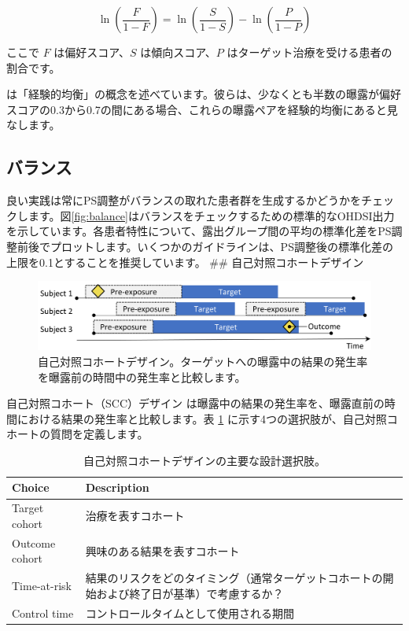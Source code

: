 \documentclass[
  11pt]{book}
\theoremstyle{definition}
\theoremstyle{definition}
\theoremstyle{definition}
\theoremstyle{definition}
\theoremstyle{remark}
\begin{document}
\[\ln\left(\frac{F}{1-F}\right)=\ln\left(\frac{S}{1-S}\right)-\ln\left(\frac{P}{1-P}\right)\]

ここで \(F\) は偏好スコア、\(S\) は傾向スコア、\(P\) はターゲット治療を受ける患者の割合です。

\citet{walker_2013} は「経験的均衡」の概念を述べています。彼らは、少なくとも半数の曝露が偏好スコアの0.3から0.7の間にある場合、これらの曝露ペアを経験的均衡にあると見なします。 

\subsection{バランス}\label{ux30d0ux30e9ux30f3ux30b9}

 

良い実践は常にPS調整がバランスの取れた患者群を生成するかどうかをチェックします。図\ref{fig:balance}はバランスをチェックするための標準的なOHDSI出力を示しています。各患者特性について、露出グループ間の平均の標準化差をPS調整前後でプロットします。いくつかのガイドラインは、PS調整後の標準化差の上限を0.1とすることを推奨しています。\citep{rubin_2001}
\#\# 自己対照コホートデザイン


\begin{figure}[h]

{\centering \includegraphics[width=0.9\linewidth]{images/PopulationLevelEstimation/selfControlledCohort} 

}

\caption{自己対照コホートデザイン。ターゲットへの曝露中の結果の発生率を曝露前の時間中の発生率と比較します。}\label{fig:scc}
\end{figure}

自己対照コホート（SCC）デザイン \citep{ryan_2013} は曝露中の結果の発生率を、曝露直前の時間における結果の発生率と比較します。表 \ref{tab:sccChoices} に示す4つの選択肢が、自己対照コホートの質問を定義します。 

\begin{table}
\centering
\caption{\label{tab:sccChoices}自己対照コホートデザインの主要な設計選択肢。}
\centering
\begin{tabular}[t]{l>{\raggedright\arraybackslash}p{9cm}}
\toprule
Choice & Description\\
\midrule
Target cohort & 治療を表すコホート\\
Outcome cohort & 興味のある結果を表すコホート\\
Time-at-risk & 結果のリスクをどのタイミング（通常ターゲットコホートの開始および終了日が基準）で考慮するか？\\
Control time & コントロールタイムとして使用される期間\\
\bottomrule
\end{tabular}
\end{table}
\end{document}
